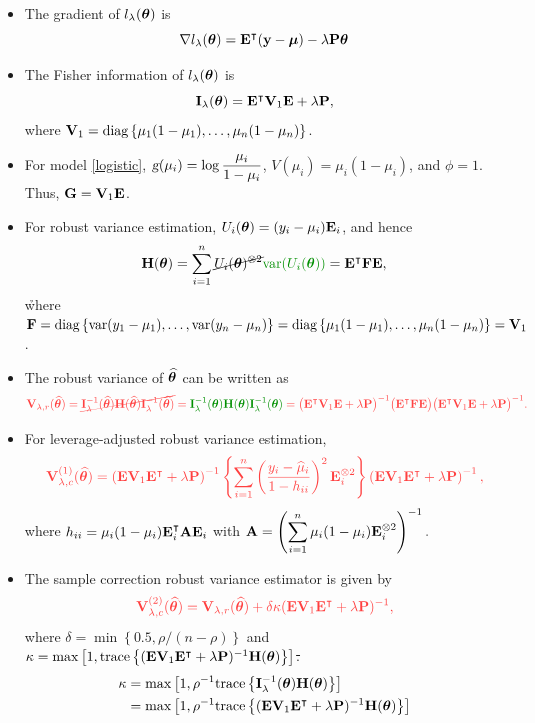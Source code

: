 \begin{itemize}
\item The gradient of $l_\lambda(\bm\theta)$ is 
$$
\nabla l_\lambda(\bm\theta) = \mathbf{E}^\intercal(\mathbf{y}-\bm\mu)-\lambda\mathbf{P}\bm\theta
$$ 
\item The Fisher information of $l_\lambda(\bm\theta)$ is
$$
\mathbf{I}_\lambda(\bm\theta) = \mathbf{E}^\intercal\mathbf{V}_1\mathbf{E}+\lambda\mathbf{P},
$$
where $\mathbf{V}_1 = \text{diag}\left\{\mu_1(1-\mu_1),\ldots,\mu_n(1-\mu_n)\right\}$. 
\item For model \eqref{logistic}, $\textsl{g}(\mu_i) = \displaystyle\log\frac{\mu_i}{1-\mu_i}$, $V(\mu_i) = \mu_i(1-\mu_i)$, and $\phi = 1$. Thus, $\mathbf{G} = \mathbf{V}_1\mathbf{E}$. 
\item For robust variance estimation, $U_i(\bm\theta) = (y_i-\mu_i)\mathbf{E}_i$, and hence	
$$
\BH(\Bt) = \sum_{i=1}^n \cancel{U_i(\Bt)^{\otimes 2}}
{\h\var(U_i(\Bt))}
= \BE^\p\BF\BE,
$$
{\h where $\mathbf{F}=\text{diag}\left\{\text{var}(y_1-\mu_1),\ldots,\text{var}(y_n-\mu_n)\right\}
	=\text{diag}\left\{\mu_1(1-\mu_1),\ldots,\mu_n(1-\mu_n)\right\}=\mathbf{V}_1$.}
\item The robust variance of $\widehat{\bm\theta}$ can be written as
$$
{\x\BV_{\lambda,r}(\wh\Bt) = \cancel{\BI_\lambda^{-1}(\wh\Bt)\BH(\wh\Bt)\BI_\lambda^{-1}(\wh\Bt)}
={\h	\BI_\lambda^{-1}(\Bt)\BH(\Bt)\BI_\lambda^{-1}(\Bt)}
= \bigl(\BE^\p\BV_1\BE+\lambda\BP\bigr)^{-1}\bigl(\BE^\p\BF\BE\bigr)\bigl(\BE^\p\BV_1\BE+\lambda\BP\bigr)^{-1}.}
$$
\item For leverage-adjusted robust variance estimation, 
$$
\x\BV_{\lambda,c}^{(1)}(\wh\Bt) 
= \left(\BE\BV_1\BE^\p+\lambda\BP\right)^{-1}\left\{\sum_{i=1}^n\left(\frac{y_i-\wh\mu_i}{1-h_{ii}}\right)^2\BE_i^{\otimes 2}\right\}\left(\BE\BV_1\BE^\p+\lambda\BP\right)^{-1},
$$
where 
$
h_{ii} =\mu_i(1-\mu_i)\mathbf{E}_i^\intercal\mathbf{A}\mathbf{E}_i
$
with 
$\mathbf{A}  = \left(\displaystyle\sum_{i=1}^n\mu_i(1-\mu_i)\mathbf{E}_i^{\otimes 2}\right)^{-1}.
$
\item The sample correction robust variance estimator is given by
$$
\x\BV_{\lambda,c}^{(2)}(\wh\Bt) = \BV_{\lambda,r}(\wh\Bt)+\delta\kappa(\BE\BV_1\BE^\p+\lambda\BP)^{-1},
$$
where 
$
\delta = \min\left\{0.5,\rho/(n-\rho)\right\}
$
and
\sout{$\kappa = \max\left[1,\text{trace}\left\{(\mathbf{E}\mathbf{V}_1\mathbf{E}^\intercal+\lambda\mathbf{P})^{-1}\mathbf{H}(\bm\theta)\right\}\right]$.}
{\h
	\begin{align*}
		\kappa 
		&= \max\left[1,\rho^{-1}\text{trace}\left\{\mathbf{I}_{\lambda}^{-1}(\bm\theta)\mathbf{H}(\bm\theta)\right\}\right] \\
		&= \max\left[1,\rho^{-1}\text{trace}\left\{(\mathbf{E}\mathbf{V}_1\mathbf{E}^\intercal+\lambda\mathbf{P})^{-1}\mathbf{H}(\bm\theta)\right\}\right] 
	\end{align*}
}

\end{itemize}

